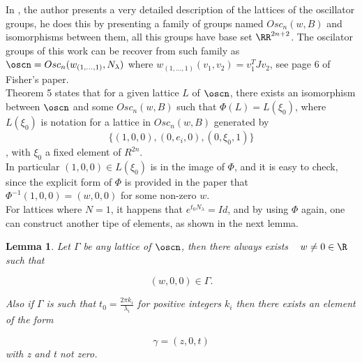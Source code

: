 \documentclass[11pt]{amsart}
\theoremstyle{plain}
\newtheorem{lem}[thm]{Lemma}
\theoremstyle{definition}
\theoremstyle{remark}
\begin{document}






In \cite{MF}, the author presents a very detailed description of the lattices of the oscillator groups, he does this by presenting a family of groups named $Osc_n(w, B)$ and isomorphisms between them, all this groups have base set $\RR^{2n+2}$. The oscilator groups of this work can be recover from such family as $\oscn = Osc_n(w_{(1,..., 1)}, N_{\lambda})$ where $w_{(1,..., 1)}(v_1,v_2)=v_1^T J v_2 $, see page 6 of Fisher's paper.\\

Theorem 5 states that for a given lattice $L$ of $\oscn$, there exists an isomorphism between $\oscn$ and some $Osc_n(w, B)$ such that $\Phi(L) = L(\xi_0)$, where $L(\xi_0)$ is notation for a lattice in $Osc_n(w, B)$ generated by  \[ \{ (1,0,0), (0,e_i,0), (0, \xi_0, 1) \} \], with $\xi_0$ a fixed element of $R^{2n}$. \\

In particular $(1,0,0) \in L(\xi_0)$ is in the image of $\Phi$, and it is easy to check, since the explicit form of $\Phi$ is provided in the paper that $\Phi^{-1}(1,0,0) = (w,0,0)$ for some non-zero $w$. \\

For lattices where $N = 1$, it happens that $e^{t_0 N_{\lambda}} = Id$, and by using $\Phi$ again, one can construct another tipe of elements, as shown in the next lemma.

\begin{lem}\cite{MF}\label{oscilador-elementos}  %
	Let $\Gamma$ be any lattice of $\oscn$, then there always exists \,\,\, $w \neq 0 \in \R$ such that
	
	\begin{equation}\label{latticew}
	(w,0,0) \in \Gamma.
	\end{equation}
	
	Also if $\Gamma$ is such that $t_0 = \frac{2 \pi k_i}{\lambda_i}$ for positive integers $k_i$ then there exists an element of the form
	
	\begin{equation}
	    \gamma = (z, 0, t)
	\end{equation}
	with z and t not zero.
	
	
	
\end{lem} 
\end{document}
